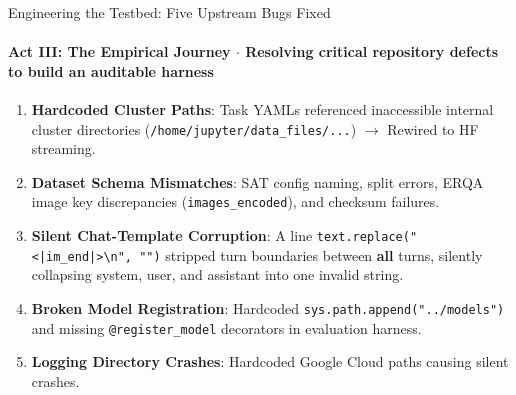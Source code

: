 \documentclass[aspectratio=169, 10pt]{beamer}
\begin{document}
\begin{frame}{Engineering the Testbed: Five Upstream Bugs Fixed}
  \framesubtitle{Act III: The Empirical Journey $\cdot$ Resolving critical repository defects to build an auditable harness}
  
  \begin{tcolorbox}[alertcard, title=\textbf{Upstream Code Defects Identified \& Resolved}]
    \small
    \begin{enumerate}\setlength{\itemsep}{4pt}
      \item \textbf{Hardcoded Cluster Paths}: Task YAMLs referenced inaccessible internal cluster directories (\texttt{/home/jupyter/data\_files/...}) $\rightarrow$ Rewired to HF streaming.
      \item \textbf{Dataset Schema Mismatches}: SAT config naming, split errors, ERQA image key discrepancies (\texttt{images\_encoded}), and checksum failures.
      \item \textbf{Silent Chat-Template Corruption}: A line \texttt{text.replace("<|im\_end|>\textbackslash n", "")} stripped turn boundaries between \textbf{all} turns, silently collapsing system, user, and assistant into one invalid string.
      \item \textbf{Broken Model Registration}: Hardcoded \texttt{sys.path.append("../models")} and missing \texttt{@register\_model} decorators in evaluation harness.
      \item \textbf{Logging Directory Crashes}: Hardcoded Google Cloud paths causing silent crashes.
    \end{enumerate}
  \end{tcolorbox}

\end{frame}
\end{document}
